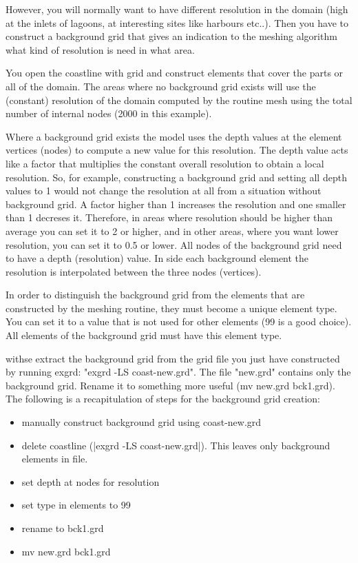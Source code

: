 However, you will normally want to have different resolution
in the domain (high at the inlets of lagoons, at interesting
sites like harbours etc..). Then you have to construct a
background grid that gives an indication to the meshing
algorithm what kind of resolution is need in what area.

You open the coastline with grid and construct elements
that cover the parts or all of the domain. The areas where
no background grid exists will use the (constant) resolution of the
domain computed by the routine mesh using the total number of
internal nodes (2000 in this example).

Where a background grid exists the model uses the depth values at the
element vertices (nodes) to compute a new value for this resolution.
The depth value acts like a factor that multiplies the constant
overall resolution to obtain a local resolution. So, for example,
constructing a background grid and setting all depth values to 1
would not change the resolution at all from a situation without
background grid. A factor higher than 1 increases the resolution
and one smaller than 1 decreses it. Therefore, in areas where
resolution should be higher than average you can set it to
2 or higher, and in other areas, where you want lower resolution,
you can set it to 0.5 or lower. All nodes of the background grid
need to have a depth (resolution) value. In side each background
element the resolution is interpolated between the three nodes
(vertices).

In order to distinguish the background grid from the elements
that are constructed by the meshing routine, they must become
a unique element type. You can set it to a value that is not
used for other elements (99 is a good choice). All elements
of the background grid must have this element type.

withse extract the background grid from the grid file you just
have constructed by running exgrd: "exgrd -LS coast-new.grd".
The file "new.grd" contains only the background grid. Rename it to
something more useful (mv new.grd bck1.grd).
The following is a recapitulation of steps for the background grid creation:

\begin{itemize}
\item        manually construct background grid using coast-new.grd
\item        delete coastline (|exgrd -LS coast-new.grd|).
		This leaves only background elements in file.
\item        set depth at nodes for resolution
\item        set type in elements to 99 
\item        rename to bck1.grd
\item        mv new.grd bck1.grd
\end{itemize}


